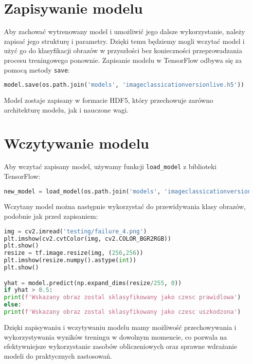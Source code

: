 \section{Zapisywanie modelu}
Aby zachować wytrenowany model i umożliwić jego dalsze wykorzystanie, należy zapisać jego strukturę i parametry. Dzięki temu będziemy mogli wczytać model i użyć go do klasyfikacji obrazów w przyszłości bez konieczności przeprowadzania procesu treningowego ponownie.
Zapisanie modelu w TensorFlow odbywa się za pomocą metody \texttt{save}:

\begin{lstlisting}[language=Python]
model.save(os.path.join('models', 'imageclassicationversionlive.h5'))
\end{lstlisting}

Model zostaje zapisany w formacie HDF5, który przechowuje zarówno architekturę modelu, jak i nauczone wagi.

\section{Wczytywanie modelu}
Aby wczytać zapisany model, używamy funkcji \texttt{load\_model} z biblioteki TensorFlow:

\begin{lstlisting}[language=Python]
new_model = load_model(os.path.join('models', 'imageclassicationversionlive.h5'))
\end{lstlisting}

Wczytany model można następnie wykorzystać do przewidywania klasy obrazów, podobnie jak przed zapisaniem:

\begin{lstlisting}[language=Python]
img = cv2.imread('testing/failure_4.png')
plt.imshow(cv2.cvtColor(img, cv2.COLOR_BGR2RGB))
plt.show()
resize = tf.image.resize(img, (256,256))
plt.imshow(resize.numpy().astype(int))
plt.show()

yhat = model.predict(np.expand_dims(resize/255, 0))
if yhat > 0.5:
print(f'Wskazany obraz zostal sklasyfikowany jako czesc prawidlowa')
else:
print(f'Wskazany obraz zostal sklasyfikowany jako czesc uszkodzona')
\end{lstlisting}

Dzięki zapisywaniu i wczytywaniu modelu mamy możliwość przechowywania i wykorzystywania wyników treningu w dowolnym momencie, co pozwala na efektywniejsze wykorzystanie zasobów obliczeniowych oraz sprawne wdrażanie modeli do praktycznych zastosowań.
